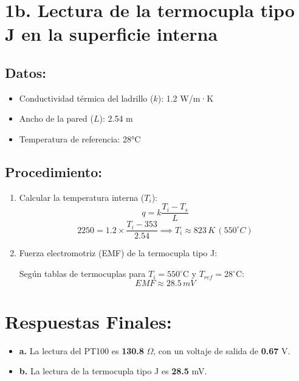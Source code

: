 \documentclass[a4paper,12pt]{article}
\begin{document}
\section*{1b. Lectura de la termocupla tipo J en la superficie interna}

\subsection*{Datos:}
\begin{itemize}
    \item Conductividad térmica del ladrillo ($k$): 1.2 W/m·K
    \item Ancho de la pared ($L$): 2.54 m
    \item Temperatura de referencia: 28°C
\end{itemize}

\subsection*{Procedimiento:}

\begin{enumerate}
    \item Calcular la temperatura interna ($T_i$):
    \[
    q = k \frac{T_i - T_s}{L}
    \]
    \[
    2250 = 1.2 \times \frac{T_i - 353}{2.54} \implies T_i \approx 823 \, K \, (550^\circ C)
    \]

    \item Fuerza electromotriz (EMF) de la termocupla tipo J:
    
    Según tablas de termocuplas para $T_i = 550^\circ$C y $T_{ref} = 28^\circ$C:
    \[
    EMF \approx 28.5 \, mV
    \]
\end{enumerate}

\section*{Respuestas Finales:}
\begin{itemize}
    \item \textbf{a.} La lectura del PT100 es \textbf{130.8} $\Omega$, con un voltaje de salida de \textbf{0.67} V.
    \item \textbf{b.} La lectura de la termocupla tipo J es \textbf{28.5} mV.
\end{itemize}
\end{document}
